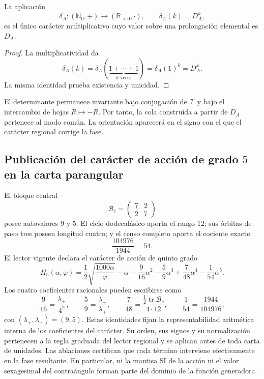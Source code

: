 \begin{proposition}
\label{p3-20260826:prop:caracter-determinante}
La aplicación
\[
\delta_A:(\mathbb N_0,+)\longrightarrow(\mathbb R_{>0},\cdot),
\qquad
\delta_A(k)=D_A^k,
\]
es el único carácter multiplicativo cuyo valor sobre una prolongación
elemental es \(D_A\).
\end{proposition}

\begin{proof}
La multiplicatividad da
\[
\delta_A(k)
=\delta_A(\underbrace{1+\cdots+1}_{k\text{ veces}})
=\delta_A(1)^k=D_A^k.
\]
La misma identidad prueba existencia y unicidad.
\end{proof}

El determinante permanece invariante bajo conjugación de
\(\mathcal T\) y bajo el intercambio de hojas \(R\mapsto-R\). Por tanto, la
cola construida a partir de \(D_A\) pertenece al modo común. La orientación
aparecerá en el signo con el que el carácter regional corrige la fase.

\subsection{Publicación del carácter de acción de grado \texorpdfstring{\(5\)}{5} en la carta parangular}
\label{sec:s102:c38:3:5}


El bloque central
\[
\mathcal B_c=\begin{pmatrix}7&2\\2&7\end{pmatrix}
\]
posee autovalores \(9\) y \(5\). El ciclo dodecafásico aporta el rango
\(12\); sus órbitas de paso tres poseen longitud cuatro; y el censo completo
aporta el cociente exacto
\[
\frac{104976}{1944}=54.
\]
El lector vigente declara el carácter de acción de quinto grado
\[
\boxed{
H_5(\alpha,\varphi)
=\frac12\sqrt{\frac{1000\alpha}{\varphi}}-\alpha
+\frac9{16}\alpha^2-\frac59\alpha^3
+\frac7{48}\alpha^4-\frac1{54}\alpha^5.}
\]
Los cuatro coeficientes racionales pueden escribirse como
\[
\frac9{16}=\frac{\lambda_+}{4^2},
\qquad
\frac59=\frac{\lambda_-}{\lambda_+},
\qquad
\frac7{48}=\frac{\tfrac12\operatorname{tr}\mathcal B_c}{4\cdot12},
\qquad
\frac1{54}=\frac{1944}{104976},
\]
con \((\lambda_+,\lambda_-)=(9,5)\). Estas identidades fijan la
representabilidad aritmética interna de los coeficientes del carácter. Su
orden, sus signos y su normalización pertenecen a la regla graduada del lector
regional y se aplican antes de toda carta de unidades. Las ablaciones
certifican que cada término interviene efectivamente en la fase resultante.
En particular, ni la mantisa SI de la acción ni el valor sexagesimal del
contraángulo forman parte del dominio de la función generadora.

